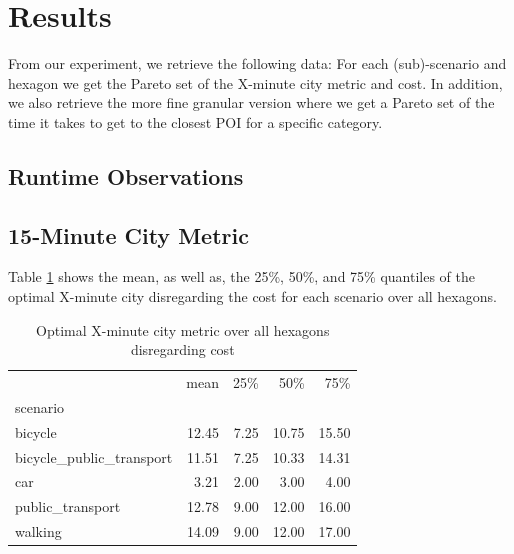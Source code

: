 \clearpage
\section{Results}
\label{sec:results}


From our experiment, we retrieve the following data:
For each (sub)-scenario and hexagon we get the Pareto set of the X-minute city metric and cost.
In addition, we also retrieve the more fine granular version where we get a Pareto set of the time it takes to get to the closest POI for a specific category.

\subsection{Runtime Observations}
\label{subsec:runtime_observations}

\subsection{15-Minute City Metric}
\label{subsec:15_minute_city_metric}

Table \ref{tab:optimal_x_minute_city_metric} shows the mean, as well as, the 25\%, 50\%, and 75\% quantiles of the optimal X-minute city disregarding the cost for each scenario over all hexagons.

\begin{table}
  \caption{Optimal X-minute city metric over all hexagons disregarding cost}
  \label{tab:optimal_x_minute_city_metric}
  \begin{center}
    \begin{tabular}{lrrrr}
       & mean & 25\% & 50\% & 75\% \\
      scenario &  &  &  &  \\
      bicycle & 12.45 & 7.25 & 10.75 & 15.50 \\
      bicycle\_public\_transport & 11.51 & 7.25 & 10.33 & 14.31 \\
      car & 3.21 & 2.00 & 3.00 & 4.00 \\
      public\_transport & 12.78 & 9.00 & 12.00 & 16.00 \\
      walking & 14.09 & 9.00 & 12.00 & 17.00 \\
    \end{tabular}
  \end{center}
\end{table}

